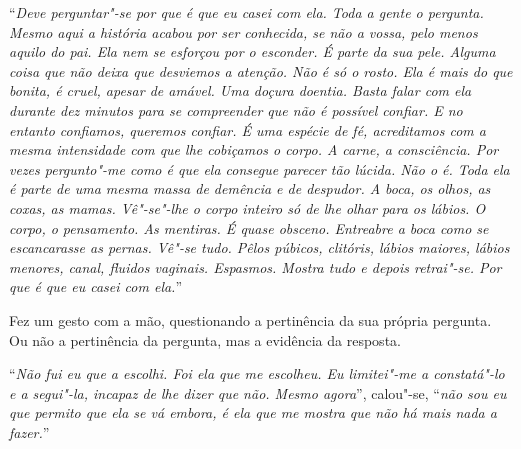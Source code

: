 ``\emph{Deve perguntar"-se por que é que eu casei com ela. Toda a gente o
pergunta. Mesmo aqui a história acabou por ser conhecida, se não a
vossa, pelo menos aquilo do pai. Ela nem se esforçou por o esconder. É
parte da sua pele. Alguma coisa que não deixa que desviemos a atenção.
Não é só o rosto. Ela é mais do que bonita, é cruel, apesar de amável.
Uma doçura doentia. Basta falar com ela durante dez minutos para se
compreender que não é possível confiar. E no entanto confiamos, queremos
confiar. É uma espécie de fé, acreditamos com a mesma intensidade com
que lhe cobiçamos o corpo. A carne, a consciência. Por vezes
pergunto"-me como é que ela consegue parecer tão lúcida. Não o é. Toda
ela é parte de uma mesma massa de demência e de despudor. A boca, os
olhos, as coxas, as mamas. Vê"-se"-lhe o corpo inteiro só de lhe olhar
para os lábios. O corpo, o pensamento. As mentiras. É quase obsceno.
Entreabre a boca como se escancarasse as pernas. Vê"-se tudo. Pêlos
púbicos, clitóris, lábios maiores, lábios menores, canal, fluidos
vaginais. Espasmos. Mostra tudo e depois retrai"-se. Por que é que eu
casei com ela.}''

Fez um gesto com a mão, questionando a pertinência da sua própria
pergunta. Ou não a pertinência da pergunta, mas a evidência da resposta.

``\emph{Não fui eu que a escolhi. Foi ela que me escolheu. Eu limitei"-me
a constatá"-lo e a segui"-la, incapaz de lhe dizer que não. Mesmo
agora}'',
calou"-se,
``\emph{não sou eu que permito que ela se vá embora, é ela que me mostra
que não há mais nada a fazer.}''

